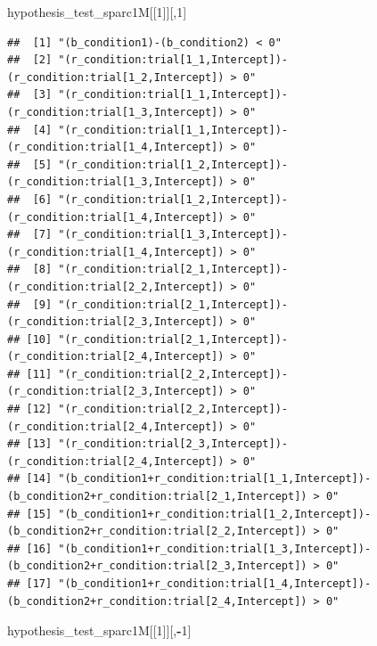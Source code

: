 \documentclass[
]{article}
\newenvironment{Shaded}{\begin{snugshade}}{\end{snugshade}}
\newcommand{\DecValTok}[1]{\textcolor[rgb]{0.00,0.00,0.81}{#1}}
\newcommand{\NormalTok}[1]{#1}
\newcommand{\SpecialCharTok}[1]{\textcolor[rgb]{0.81,0.36,0.00}{\textbf{#1}}}
\begin{document}
\begin{Shaded}
\begin{Highlighting}[]
\NormalTok{hypothesis\_test\_sparc1M[[}\DecValTok{1}\NormalTok{]][,}\DecValTok{1}\NormalTok{]}
\end{Highlighting}
\end{Shaded}

\begin{verbatim}
##  [1] "(b_condition1)-(b_condition2) < 0"                                                                  
##  [2] "(r_condition:trial[1_1,Intercept])-(r_condition:trial[1_2,Intercept]) > 0"                          
##  [3] "(r_condition:trial[1_1,Intercept])-(r_condition:trial[1_3,Intercept]) > 0"                          
##  [4] "(r_condition:trial[1_1,Intercept])-(r_condition:trial[1_4,Intercept]) > 0"                          
##  [5] "(r_condition:trial[1_2,Intercept])-(r_condition:trial[1_3,Intercept]) > 0"                          
##  [6] "(r_condition:trial[1_2,Intercept])-(r_condition:trial[1_4,Intercept]) > 0"                          
##  [7] "(r_condition:trial[1_3,Intercept])-(r_condition:trial[1_4,Intercept]) > 0"                          
##  [8] "(r_condition:trial[2_1,Intercept])-(r_condition:trial[2_2,Intercept]) > 0"                          
##  [9] "(r_condition:trial[2_1,Intercept])-(r_condition:trial[2_3,Intercept]) > 0"                          
## [10] "(r_condition:trial[2_1,Intercept])-(r_condition:trial[2_4,Intercept]) > 0"                          
## [11] "(r_condition:trial[2_2,Intercept])-(r_condition:trial[2_3,Intercept]) > 0"                          
## [12] "(r_condition:trial[2_2,Intercept])-(r_condition:trial[2_4,Intercept]) > 0"                          
## [13] "(r_condition:trial[2_3,Intercept])-(r_condition:trial[2_4,Intercept]) > 0"                          
## [14] "(b_condition1+r_condition:trial[1_1,Intercept])-(b_condition2+r_condition:trial[2_1,Intercept]) > 0"
## [15] "(b_condition1+r_condition:trial[1_2,Intercept])-(b_condition2+r_condition:trial[2_2,Intercept]) > 0"
## [16] "(b_condition1+r_condition:trial[1_3,Intercept])-(b_condition2+r_condition:trial[2_3,Intercept]) > 0"
## [17] "(b_condition1+r_condition:trial[1_4,Intercept])-(b_condition2+r_condition:trial[2_4,Intercept]) > 0"
\end{verbatim}

\begin{Shaded}
\begin{Highlighting}[]
\NormalTok{hypothesis\_test\_sparc1M[[}\DecValTok{1}\NormalTok{]][,}\SpecialCharTok{{-}}\DecValTok{1}\NormalTok{]}
\end{Highlighting}
\end{Shaded}
\end{document}

